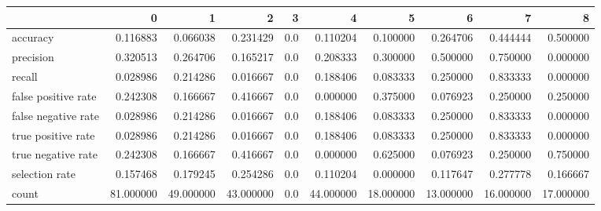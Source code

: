 \begin{tabular}{lrrrrrrrrr}
\toprule
{} &          0 &          1 &          2 &    3 &          4 &          5 &          6 &          7 &          8 \\
\midrule
accuracy            &   0.116883 &   0.066038 &   0.231429 &  0.0 &   0.110204 &   0.100000 &   0.264706 &   0.444444 &   0.500000 \\
precision           &   0.320513 &   0.264706 &   0.165217 &  0.0 &   0.208333 &   0.300000 &   0.500000 &   0.750000 &   0.000000 \\
recall              &   0.028986 &   0.214286 &   0.016667 &  0.0 &   0.188406 &   0.083333 &   0.250000 &   0.833333 &   0.000000 \\
false positive rate &   0.242308 &   0.166667 &   0.416667 &  0.0 &   0.000000 &   0.375000 &   0.076923 &   0.250000 &   0.250000 \\
false negative rate &   0.028986 &   0.214286 &   0.016667 &  0.0 &   0.188406 &   0.083333 &   0.250000 &   0.833333 &   0.000000 \\
true positive rate  &   0.028986 &   0.214286 &   0.016667 &  0.0 &   0.188406 &   0.083333 &   0.250000 &   0.833333 &   0.000000 \\
true negative rate  &   0.242308 &   0.166667 &   0.416667 &  0.0 &   0.000000 &   0.625000 &   0.076923 &   0.250000 &   0.750000 \\
selection rate      &   0.157468 &   0.179245 &   0.254286 &  0.0 &   0.110204 &   0.000000 &   0.117647 &   0.277778 &   0.166667 \\
count               &  81.000000 &  49.000000 &  43.000000 &  0.0 &  44.000000 &  18.000000 &  13.000000 &  16.000000 &  17.000000 \\
\bottomrule
\end{tabular}
